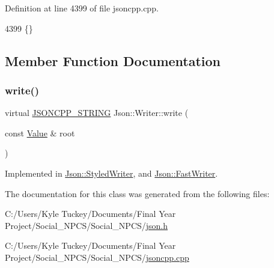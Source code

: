 Definition at line 4399 of file jsoncpp.\+cpp.


\begin{DoxyCode}
4399 \{\}
\end{DoxyCode}


\subsection{Member Function Documentation}
\mbox{\label{class_json_1_1_writer_a61c55882b82c7651d0b9b683c6d3f371}} 
\subsubsection{\texorpdfstring{write()}{write()}}
{\footnotesize\ttfamily virtual \hyperlink{json_8h_a1e723f95759de062585bc4a8fd3fa4be}{J\+S\+O\+N\+C\+P\+P\+\_\+\+S\+T\+R\+I\+NG} Json\+::\+Writer\+::write (\begin{DoxyParamCaption}\item[{const \hyperlink{class_json_1_1_value}{Value} \&}]{root }\end{DoxyParamCaption})\hspace{0.3cm}{\ttfamily [pure virtual]}}



Implemented in \hyperlink{class_json_1_1_styled_writer_a5efab19b9746da9920c29cdae3a6b404}{Json\+::\+Styled\+Writer}, and \hyperlink{class_json_1_1_fast_writer_a93d45ba4bc312371d08beb3e3dfbe654}{Json\+::\+Fast\+Writer}.



The documentation for this class was generated from the following files\+:\begin{DoxyCompactItemize}
\item 
C\+:/\+Users/\+Kyle Tuckey/\+Documents/\+Final Year Project/\+Social\+\_\+\+N\+P\+C\+S/\+Social\+\_\+\+N\+P\+C\+S/\hyperlink{json_8h}{json.\+h}\item 
C\+:/\+Users/\+Kyle Tuckey/\+Documents/\+Final Year Project/\+Social\+\_\+\+N\+P\+C\+S/\+Social\+\_\+\+N\+P\+C\+S/\hyperlink{jsoncpp_8cpp}{jsoncpp.\+cpp}\end{DoxyCompactItemize}
